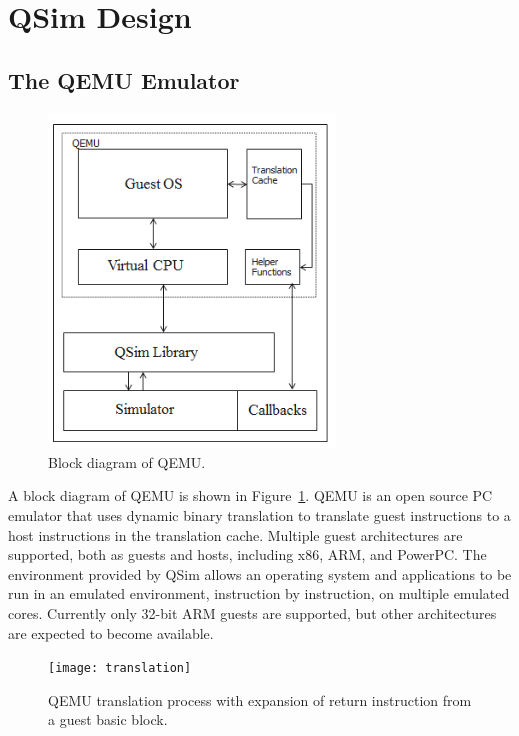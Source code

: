 \documentclass[letterpaper, 10pt]{book}
\begin{document}
\section{QSim Design}

\subsection{The QEMU Emulator}

\begin{figure}
\begin{center}
\includegraphics[width=3in]{qsim_architecture}
\caption{Block diagram of QEMU.}
\label{fig:qemu}
\end{center}
\end{figure}

A block diagram of QEMU is shown in Figure~\ref{fig:qemu}. QEMU is an open
source PC emulator that uses dynamic binary translation to translate guest
instructions to a host instructions in the translation cache. Multiple
guest architectures are supported, both as guests and hosts, including x86,
ARM, and PowerPC. The environment provided by QSim allows an operating system
and applications to be run in an emulated environment, instruction by
instruction, on multiple emulated cores. Currently only 32-bit ARM guests are
supported, but other architectures are expected to become available.

\begin{figure}
\begin{center}
\texttt{[image: translation]}
\caption{QEMU translation process with expansion of return instruction from a
  guest basic block.}
\label{fig:translation}
\end{center}
\end{figure}
\end{document}
